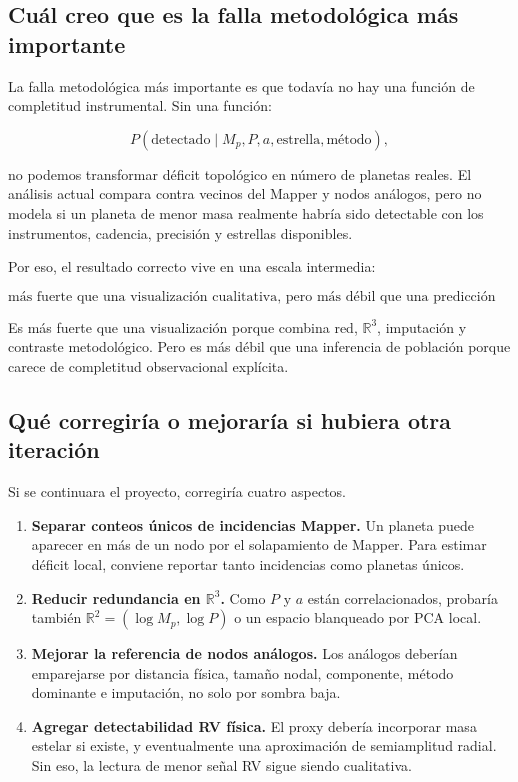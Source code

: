 \documentclass[11pt]{article}
\begin{document}
\subsection{Cuál creo que es la falla metodológica más importante}

La falla metodológica más importante es que todavía no hay una función de completitud instrumental. Sin una función:

\[
P(\mathrm{detectado}\mid M_p,P,a,\text{estrella},\text{método}),
\]

no podemos transformar déficit topológico en número de planetas reales. El análisis actual compara contra vecinos del Mapper y nodos análogos, pero no modela si un planeta de menor masa realmente habría sido detectable con los instrumentos, cadencia, precisión y estrellas disponibles.

Por eso, el resultado correcto vive en una escala intermedia:

\[
\text{más fuerte que una visualización cualitativa, pero más débil que una predicción poblacional.}
\]

Es más fuerte que una visualización porque combina red, $\mathbb{R}^3$, imputación y contraste metodológico. Pero es más débil que una inferencia de población porque carece de completitud observacional explícita.

\subsection{Qué corregiría o mejoraría si hubiera otra iteración}

Si se continuara el proyecto, corregiría cuatro aspectos.

\begin{enumerate}
    \item \textbf{Separar conteos únicos de incidencias Mapper.} Un planeta puede aparecer en más de un nodo por el solapamiento de Mapper. Para estimar déficit local, conviene reportar tanto incidencias como planetas únicos.
    \item \textbf{Reducir redundancia en $\mathbb{R}^3$.} Como $P$ y $a$ están correlacionados, probaría también $\mathbb{R}^2=(\log M_p,\log P)$ o un espacio blanqueado por PCA local.
    \item \textbf{Mejorar la referencia de nodos análogos.} Los análogos deberían emparejarse por distancia física, tamaño nodal, componente, método dominante e imputación, no solo por sombra baja.
    \item \textbf{Agregar detectabilidad RV física.} El proxy debería incorporar masa estelar si existe, y eventualmente una aproximación de semiamplitud radial. Sin eso, la lectura de menor señal RV sigue siendo cualitativa.
\end{enumerate}
\end{document}
